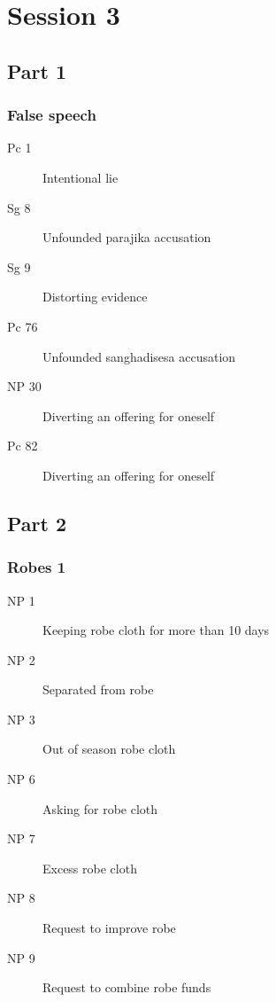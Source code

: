 \documentclass[11pt,oneside]{memoir}
\begin{document}
\chapter{Session 3}

\begin{multicols}{2}

\section{Part 1}

\subsection{False speech}

\begin{description}
\item[Pc 1] Intentional lie
\item[Sg 8] Unfounded parajika accusation
\item[Sg 9] Distorting evidence
\item[Pc 76] Unfounded sanghadisesa accusation
\item[NP 30] Diverting an offering for oneself
\item[Pc 82] Diverting an offering for oneself
\end{description}

\columnbreak

\section{Part 2}

\subsection{Robes 1}

\begin{description}
\item[NP 1] Keeping robe cloth for more than 10 days
\item[NP 2] Separated from robe
\item[NP 3] Out of season robe cloth
\item[NP 6] Asking for robe cloth
\item[NP 7] Excess robe cloth
\item[NP 8] Request to improve robe
\item[NP 9] Request to combine robe funds
\end{description}

\end{multicols}
\end{document}
